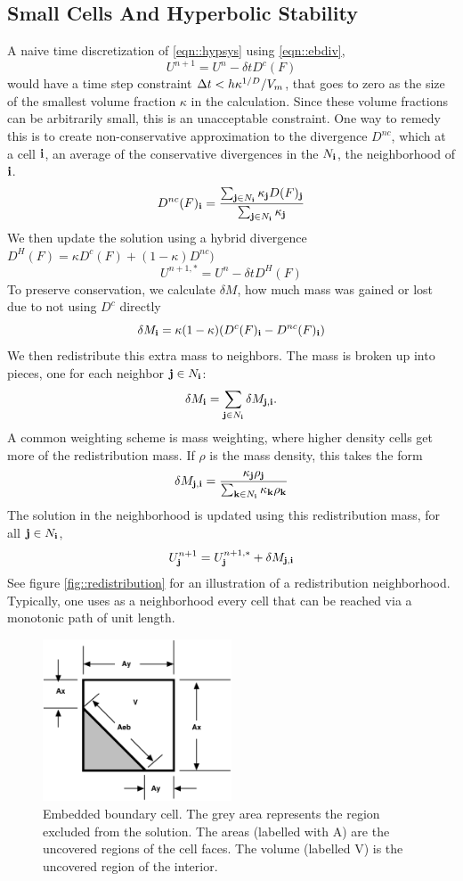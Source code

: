 \subsection{Small Cells And Hyperbolic Stability}

A naive time discretization of \ref{eqn::hypsys}
using \ref{eqn::ebdiv},
$$
U^{n+1} = U^{n} - \delta t D^c(F)
$$
would have a time step constraint $\Delta t < h \kappa^{1/D}/V_m$,  that
goes to zero as the size of the 
smallest volume  fraction $\kappa$ in the calculation.  Since these volume fractions can
be arbitrarily small, this is an unacceptable constraint.  One way to remedy
this is to create  non-conservative approximation to the divergence
$D^{nc}$, which at a cell ${\bf i}$, an average of the conservative divergences in the
$N_{\bf i}$, the neighborhood of ${\bf i}$.
$$
D^{nc}(F)_{\bf i} = \frac{\sum_{{\bf j} \in N_{\bf i}}\kappa_{\bf j} D(F)_{\bf j}}{\sum_{{\bf j} \in N_{\bf i}}\kappa_{\bf j}}
$$
We then update the solution using a hybrid divergence $D^H(F) =
\kappa D^c(F) + (1-\kappa)D^{nc})$
$$
U^{n+1,*} = U^n - \delta t D^H(F)
$$
To preserve conservation, we calculate $\delta M$, how much mass was gained or
lost due to not using $D^c$ directly
$$
\delta M_{\bf i} = \kappa (1-\kappa)(D^c(F)_{\bf i} - D^{nc}(F)_{\bf i})
$$
We then redistribute this extra mass to neighbors.   The mass is
broken up into pieces, one for each neighbor ${\bf j} \in N_{\bf i}$:
$$
\delta M_{\bf i} = \sum_{{\bf j} \in N_{\bf i}} \delta M_{{\bf j}, {\bf i}}.
$$
A common weighting scheme is  
mass weighting, where higher density cells get more of the
redistribution mass.    If $\rho$ is the mass density, this takes the
form
$$
\delta M_{{\bf j}, {\bf i}} = \frac{\kappa_{\bf j}
  \rho_{\bf j}}{\sum_{{\bf k} \in N_{\bf i}} \kappa_{\bf k} \rho_{\bf k}}
$$
The solution in the neighborhood is updated using this redistribution
mass, for all ${\bf j} \in N_{\bf i}$,
$$
U^{n+1}_{\bf j} = U^{n+1,*}_{\bf j} + \delta M_{{\bf j},{\bf i}}
$$
See  figure \ref{fig::redistribution} for an illustration of a
redistribution neighborhood.   Typically, one uses as a neighborhood
every cell that can be reached via a  monotonic path of unit length.

\begin{figure}[p]
  \centering
  \includegraphics[width=0.5\textwidth]{./EB/areas_and_volumes.pdf}
\caption{\label{fig::volume}Embedded boundary cell. The grey area represents 
the region excluded from the solution.   The areas (labelled with A) are the uncovered
regions of the cell faces.  The volume (labelled V) is the uncovered
region of the interior.}
\end{figure}


